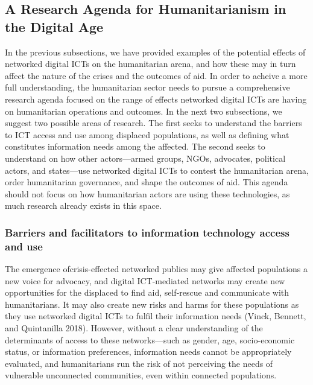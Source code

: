 \documentclass[
]{article}
\begin{document}
\hypertarget{a-research-agenda-for-humanitarianism-in-the-digital-age}{%
\subsection{A Research Agenda for Humanitarianism in the Digital
Age}\label{a-research-agenda-for-humanitarianism-in-the-digital-age}}

In the previous subsections, we have provided examples of the potential
effects of networked digital ICTs on the humanitarian arena, and how
these may in turn affect the nature of the crises and the outcomes of
aid. In order to acheive a more full understanding, the humanitarian
sector needs to pursue a comprehensive research agenda focused on the
range of effects networked digital ICTs are having on humanitarian
operations and outcomes. In the next two subsections, we suggest two
possible areas of research. The first seeks to understand the barriers
to ICT access and use among displaced populations, as well as defining
what constitutes information needs among the affected. The second seeks
to understand on how other actors---armed groups, NGOs, advocates,
political actors, and states---use networked digital ICTs to contest the
humanitarian arena, order humanitarian governance, and shape the
outcomes of aid. This agenda should not focus on how humanitarian actors
are using these technologies, as much research already exists in this
space.

\hypertarget{barriers-and-facilitators-to-information-technology-access-and-use}{%
\subsubsection{Barriers and facilitators to information technology
access and
use}\label{barriers-and-facilitators-to-information-technology-access-and-use}}

The emergence ofcrisis-effected networked publics may give affected
populations a new voice for advocacy, and digital ICT-mediated networks
may create new opportunities for the displaced to find aid, self-rescue
and communicate with humanitarians. It may also create new risks and
harms for these populations as they use networked digital ICTs to fulfil
their information needs (Vinck, Bennett, and Quintanilla 2018). However,
without a clear understanding of the determinants of access to these
networks---such as gender, age, socio-economic status, or information
preferences, information needs cannot be appropriately evaluated, and
humanitarians run the risk of not perceiving the needs of vulnerable
unconnected communities, even within connected populations.
\end{document}
